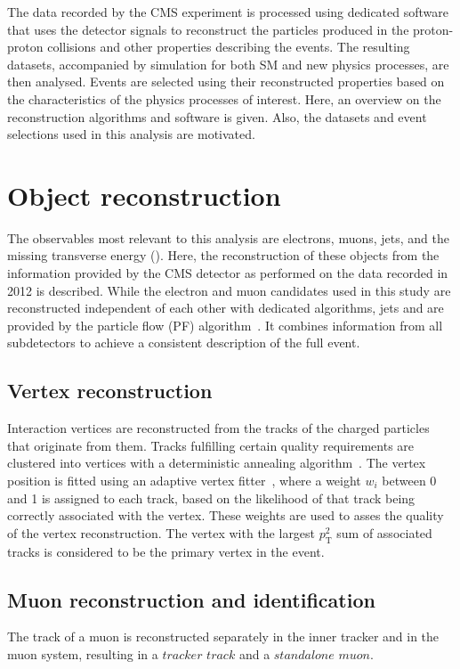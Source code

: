 \label{sec:ana}
The data recorded by the CMS experiment is processed using dedicated software that uses the detector signals to reconstruct the particles produced in the proton-proton collisions and other properties describing the events. The resulting datasets, accompanied by simulation for both SM and new physics processes, are then analysed. Events are selected using their reconstructed properties based on the characteristics of the physics processes of interest. Here, an overview on the reconstruction algorithms and software is given. Also, the datasets and event selections used in this analysis are motivated.
\section{Object reconstruction}
\label{sec:objects}
The observables most relevant to this analysis are electrons, muons, jets, and the missing transverse energy (\MET). Here, the reconstruction of these objects from the information provided by the CMS detector as performed on the data recorded in 2012 is described. While the electron and muon candidates used in this study are reconstructed independent of each other with dedicated algorithms, jets and \MET are provided by the particle flow (PF) algorithm~\cite{CMS-PAS-PFT-09-001}. It combines information from all subdetectors to achieve a consistent description of the full event. 

\subsection{Vertex reconstruction}
Interaction vertices are reconstructed from the tracks of the charged particles that originate from them.
Tracks fulfilling certain quality requirements are clustered into vertices with a deterministic annealing algorithm~\cite{DertermisiticAnnealing,Chatrchyan:2014fea}. The vertex position is fitted using an adaptive vertex fitter~\cite{Fruehwirth:1027031}, where a weight $w_i$ between 0 and 1 is assigned to each track, based on the likelihood of that track being correctly associated with the vertex. These weights are used to asses the quality of the vertex reconstruction. The vertex with the largest $p_\mathrm{T}^2$ sum of associated tracks is considered to be the primary vertex in the event.

\subsection{Muon reconstruction and identification}
The track of a muon is reconstructed separately in the inner tracker and in the muon system, resulting in a $\textit{tracker track}$ and a $\textit{standalone muon}$. 

